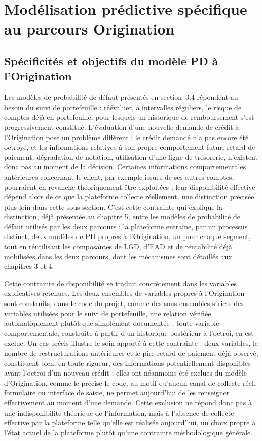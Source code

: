 \section{Modélisation prédictive spécifique au parcours Origination}

\subsection{Spécificités et objectifs du modèle PD à l'Origination}

Les modèles de probabilité de défaut présentés en section~3.4 répondent au besoin du suivi de portefeuille : réévaluer, à intervalles réguliers, le risque de comptes déjà en portefeuille, pour lesquels un historique de remboursement s'est progressivement constitué. L'évaluation d'une nouvelle demande de crédit à l'Origination pose un problème différent : le crédit demandé n'a pas encore été octroyé, et les informations relatives à son propre comportement futur, retard de paiement, dégradation de notation, utilisation d'une ligne de trésorerie, n'existent donc pas au moment de la décision. Certaines informations comportementales antérieures concernant le client, par exemple issues de ses autres comptes, pourraient en revanche théoriquement être exploitées ; leur disponibilité effective dépend alors de ce que la plateforme collecte réellement, une distinction précisée plus loin dans cette sous-section. C'est cette contrainte qui explique la distinction, déjà présentée au chapitre 5, entre les modèles de probabilité de défaut utilisés par les deux parcours : la plateforme entraîne, par un processus distinct, deux modèles de PD propres à l'Origination, un pour chaque segment, tout en réutilisant les composantes de LGD, d'EAD et de rentabilité déjà mobilisées dans les deux parcours, dont les mécanismes sont détaillés aux chapitres 3 et 4.

Cette contrainte de disponibilité se traduit concrètement dans les variables explicatives retenues. Les deux ensembles de variables propres à l'Origination sont construits, dans le code du projet, comme des sous-ensembles stricts des variables utilisées pour le suivi de portefeuille, une relation vérifiée automatiquement plutôt que simplement documentée : toute variable comportementale, construite à partir d'un historique postérieur à l'octroi, en est exclue. Un cas précis illustre le soin apporté à cette contrainte : deux variables, le nombre de restructurations antérieures et le pire retard de paiement déjà observé, constituent bien, en toute rigueur, des informations potentiellement disponibles avant l'octroi d'un nouveau crédit ; elles ont néanmoins été exclues du modèle d'Origination, comme le précise le code, au motif qu'aucun canal de collecte réel, formulaire ou interface de saisie, ne permet aujourd'hui de les renseigner effectivement au moment d'une demande. Cette exclusion ne répond donc pas à une indisponibilité théorique de l'information, mais à l'absence de collecte effective par la plateforme telle qu'elle est réalisée aujourd'hui, un choix propre à l'état actuel de la plateforme plutôt qu'une contrainte méthodologique générale.

